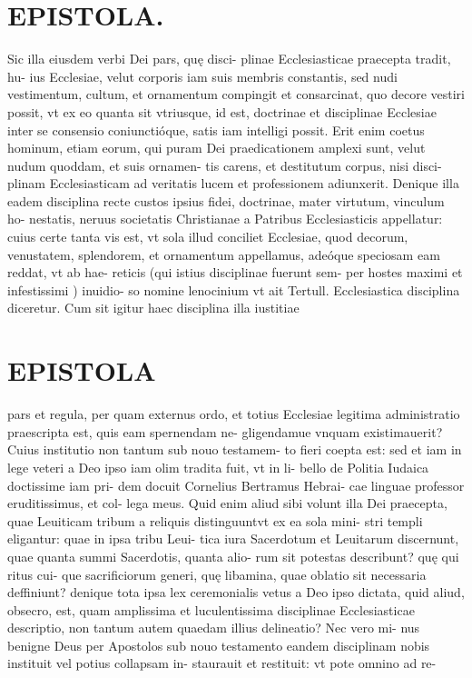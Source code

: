 \documentclass{article}
\begin{document}
\begin{pages}
\section*{EPISTOLA. }Sic illa eiusdem verbi Dei pars, quę disci- plinae Ecclesiasticae praecepta tradit, hu- ius Ecclesiae, velut corporis iam suis membris constantis, sed nudi vestimentum, cultum, et ornamentum compingit et consarcinat, quo decore vestiri possit, vt ex eo quanta sit vtriusque, id est, doctrinae et disciplinae Ecclesiae inter se consensio coniunctióque, satis iam intelligi possit. Erit enim coetus hominum, etiam eorum, qui puram Dei praedicationem amplexi sunt, velut nudum quoddam, et suis ornamen- tis carens, et destitutum corpus, nisi disci- plinam Ecclesiasticam ad veritatis lucem et professionem adiunxerit. Denique illa eadem disciplina recte custos ipsius fidei, doctrinae, mater virtutum, vinculum ho- nestatis, neruus societatis Christianae a Patribus Ecclesiasticis appellatur: cuius certe tanta vis est, vt sola illud conciliet Ecclesiae, quod decorum, venustatem, splendorem, et ornamentum appellamus, adeóque speciosam eam reddat, vt ab hae- reticis (qui istius disciplinae fuerunt sem- per hostes maximi et infestissimi ) inuidio- so nomine lenocinium vt ait Tertull. Ecclesiastica disciplina diceretur. Cum sit igitur haec disciplina illa iustitiae 
\section*{EPISTOLA }pars et regula, per quam externus ordo, et totius Ecclesiae legitima administratio praescripta est, quis eam spernendam ne- gligendamue vnquam existimauerit? Cuius institutio non tantum sub nouo testamem- to fieri coepta est: sed et iam in lege veteri a Deo ipso iam olim tradita fuit, vt in li- bello de Politia Iudaica doctissime iam pri- dem docuit Cornelius Bertramus Hebrai- cae linguae professor eruditissimus, et col- lega meus. Quid enim aliud sibi volunt illa Dei praecepta, quae Leuiticam tribum a reliquis distinguuntvt ex ea sola mini- stri templi eligantur: quae in ipsa tribu Leui- tica iura Sacerdotum et Leuitarum discernunt, quae quanta summi Sacerdotis, quanta alio- rum sit potestas describunt? quę qui ritus cui- que sacrificiorum generi, quę libamina, quae oblatio sit necessaria deffiniunt? denique tota ipsa lex ceremonialis vetus a Deo ipso dictata, quid aliud, obsecro, est, quam amplissima et luculentissima disciplinae Ecclesiasticae descriptio, non tantum autem quaedam illius delineatio? Nec vero mi- nus benigne Deus per Apostolos sub nouo testamento eandem disciplinam nobis instituit vel potius collapsam in- staurauit et restituit: vt pote omnino ad re- 

\end{pages}
\end{document}
